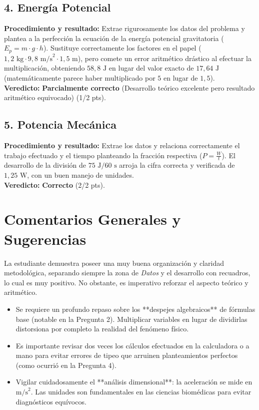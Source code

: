 \documentclass[12pt,letterpaper]{article}
\begin{document}
\subsection*{4. Energía Potencial}
\textbf{Procedimiento y resultado:} Extrae rigurosamente los datos del problema y plantea a la perfección la ecuación de la energía potencial gravitatoria ($E_p = m \cdot g \cdot h$). Sustituye correctamente los factores en el papel ($1,2 \text{ kg} \cdot 9,8 \text{ m/s}^2 \cdot 1,5 \text{ m}$), pero comete un error aritmético drástico al efectuar la multiplicación, obteniendo $58,8 \text{ J}$ en lugar del valor exacto de $17,64 \text{ J}$ (matemáticamente parece haber multiplicado por $5$ en lugar de $1,5$). \\
\textbf{Veredicto:} \textbf{Parcialmente correcto} (Desarrollo teórico excelente pero resultado aritmético equivocado) (1/2 pts).

\subsection*{5. Potencia Mecánica}
\textbf{Procedimiento y resultado:} Extrae los datos y relaciona correctamente el trabajo efectuado y el tiempo planteando la fracción respectiva ($P = \frac{W}{t}$). El desarrollo de la división de $75 \text{ J} / 60 \text{ s}$ arroja la cifra correcta y verificada de $1,25 \text{ W}$, con un buen manejo de unidades. \\
\textbf{Veredicto:} \textbf{Correcto} (2/2 pts).

\vspace{0.5cm}
\section*{Comentarios Generales y Sugerencias}
La estudiante demuestra poseer una muy buena organización y claridad metodológica, separando siempre la zona de \textit{Datos} y el desarrollo con recuadros, lo cual es muy positivo. No obstante, es imperativo reforzar el aspecto teórico y aritmético.
\begin{itemize}
    \item Se requiere un profundo repaso sobre los **despejes algebraicos** de fórmulas base (notable en la Pregunta 2). Multiplicar variables en lugar de dividirlas distorsiona por completo la realidad del fenómeno físico.
    \item Es importante revisar dos veces los cálculos efectuados en la calculadora o a mano para evitar errores de tipeo que arruinen planteamientos perfectos (como ocurrió en la Pregunta 4).
    \item Vigilar cuidadosamente el **análisis dimensional**: la aceleración se mide en $\text{m/s}^2$. Las unidades son fundamentales en las ciencias biomédicas para evitar diagnósticos equívocos.
\end{itemize}
\end{document}
